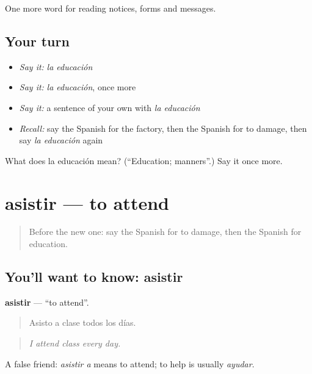 \begin{grammarlens}[title={What you've built}]
One more word for reading notices, forms and messages.
\end{grammarlens}

\subsection*{Your turn}
\begin{itemize}
\raggedright
  \item \emph{Say it:} \emph{la educación}
  \item \emph{Say it:} \emph{la educación}, once more
  \item \emph{Say it:} a sentence of your own with \emph{la educación}
  \item \emph{Recall:} say the Spanish for the factory, then the Spanish for to damage, then say \emph{la educación} again
\end{itemize}

\begin{tcolorbox}[breakable,colback=teal!4,colframe=teal!35!black,title={Before you move on}]
What does la educación mean? (\textquotedblleft{}Education; manners\textquotedblright{}.) Say it once more.
\end{tcolorbox}
\section[asistir]{asistir — to attend}

\label{lesson:ES-C505-asistir}



\begin{quote}
Before the new one: say the Spanish for to damage, then the Spanish for education.
\end{quote}

\subsection*{You'll want to know: asistir}
\textbf{asistir} — \textquotedblleft{}to attend\textquotedblright{}.

\begin{quote}
Asisto a clase todos los días.
\end{quote}

\begin{quote}
\emph{I attend class every day.}
\end{quote}

A false friend: \emph{asistir a} means to attend; to help is usually \emph{ayudar}.


